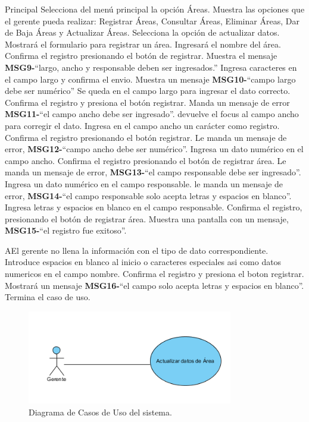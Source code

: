 	\begin{UCtrayectoria}{Principal}
		\UCpaso[\UCactor] Selecciona del menú principal la opción Áreas.
		\UCpaso Muestra las opciones que el gerente pueda realizar: Registrar Áreas, Consultar Áreas, Eliminar Áreas, Dar de Baja Áreas y Actualizar Áreas.
		\UCpaso[\UCactor] Selecciona la opción de actualizar datos.
		\UCpaso Mostrará el formulario para registrar un área.		
		\UCpaso[\UCactor] Ingresará el nombre del área.
		\UCpaso[\UCactor] Confirma el registro presionando el botón de registrar.
		\UCpaso Muestra el mensaje {\bf MSG9-}``largo, ancho y responsable deben ser ingresados.'' 	
		\UCpaso[\UCactor] Ingresa caracteres en el campo largo y confirma el envio.
		\UCpaso Muestra un mensaje {\bf MSG10-}``campo largo debe ser numérico''
		\UCpaso Se queda en el campo largo para ingresar el dato correcto.
		\UCpaso[\UCactor] Confirma el registro y presiona el botón registrar.
		\UCpaso Manda un mensaje de error {\bf MSG11-}``el campo ancho debe ser ingresado''.
		\UCpaso devuelve el focus al campo ancho para corregir el dato.
		\UCpaso[\UCactor] Ingresa en el campo ancho un carácter como registro.
		\UCpaso[\UCactor] Confirma el registro presionando el botón registrar.
		\UCpaso Le manda un mensaje de error, {\bf MSG12-}``campo ancho debe ser numérico''.
		\UCpaso[\UCactor] Ingresa un dato numérico en el campo ancho.
		\UCpaso[\UCactor] Confirma el registro presionando el botón  de registrar área.
		\UCpaso Le manda un mensaje de error, {\bf MSG13-}``el campo responsable debe ser ingresado''.
		\UCpaso[\UCactor] Ingresa un dato numérico en el campo responsable.
		\UCpaso le manda un mensaje de error, {\bf MSG14-}``el campo responsable solo acepta letras y espacios en blanco''. 
		\UCpaso[\UCactor] Ingresa letras y espacios en blanco en el campo responsable.
		\UCpaso[\UCactor] Confirma el registro, presionando el botón de registrar área.
		\UCpaso Muestra una pantalla con un mensaje, {\bf MSG15-}``el registro fue exitoso''.
	\end{UCtrayectoria}
		
		\begin{UCtrayectoriaA}{A}{El gerente no llena la información con el tipo de dato correspondiente.}
			\UCpaso[\UCactor] Introduce espacios en blanco al inicio o caracteres especiales asi como datos numericos en el campo nombre.
			\UCpaso[\UCactor] Confirma el registro y presiona el boton registrar.
			\UCpaso Mostrará un mensaje  {\bf MSG16-}``el campo solo acepta letras y espacios en blanco''.
			\UCpaso[] Termina el caso de uso.
		\end{UCtrayectoriaA}

\begin{figure}[htbp!]
		\centering
			\includegraphics[width=0.8\textwidth]{images/ActualizarArea}
		\caption{Diagrama de Casos de Uso del sistema.}
	\end{figure}